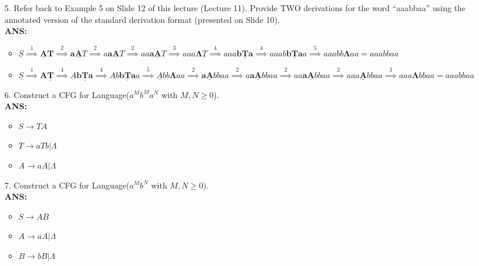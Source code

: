 \documentclass[letterpaper, 12 pt]{article}
\begin{document}
\begin{enumerate}
    \item[5.] Refer back to Example 5 on Slide 12 of this lecture (Lecture 11).
        Provide TWO derivations for the word “aaabbaa” using the annotated
        version of the standard derivation format (presented on Slide 10). \\
        \textbf{ANS:}
        \begin{itemize}
            \item $
                \underline{S} \overset{1}{\implies} \bm{\underline{A}T}
                \overset{2}{\implies} \bm{a\underline{A}}T
                \overset{2}{\implies} a\bm{a\underline{A}}T
                \overset{2}{\implies} aa\bm{a\underline{A}}T
                \overset{3}{\implies} aaa\bm{\Lambda}\underline{T}
                \overset{4}{\implies} aaa\bm{b\underline{T}a}
                \overset{4}{\implies} aaab\bm{b\underline{T}a}a
                \overset{5}{\implies} aaabb\bm{\Lambda}aa = aaabbaa
                $
            \item $
                \underline{S} \overset{1}{\implies} \bm{A\underline{T}}
                \overset{4}{\implies} A\bm{b\underline{T}a}
                \overset{4}{\implies} Ab\bm{b\underline{T}a}a
                \overset{5}{\implies} \underline{A}bb\bm{\Lambda}aa
                \overset{2}{\implies} \bm{a\underline{A}}bbaa
                \overset{2}{\implies} a\bm{a\underline{A}}bbaa
                \overset{2}{\implies} aa\bm{a\underline{A}}bbaa
                \overset{2}{\implies} aaa\bm{\underline{A}}bbaa
                \overset{3}{\implies} aaa\bm{\Lambda}bbaa = aaabbaa
                $
        \end{itemize}

    \item[6.] Construct a CFG for Language($a^Mb^Ma^N$ with $M,N \geq 0$). \\
        \textbf{ANS:} 
        \begin{itemize}
            \item $S \to TA$
            \item $T \to aTb | \Lambda$
            \item $A \to aA | \Lambda$
        \end{itemize}

    \item[7.] Construct a CFG for Language($a^Mb^N$ with $M,N \geq 0$). \\
        \textbf{ANS:}
        \begin{itemize}
            \item $S \to AB$
            \item $A \to aA | \Lambda$
            \item $B \to bB | \Lambda$
        \end{itemize}
\end{enumerate}
\end{document}

